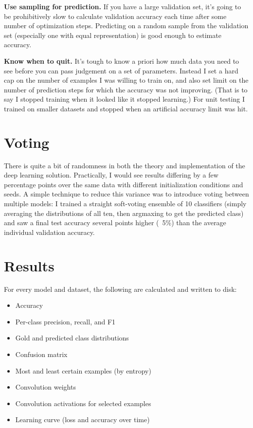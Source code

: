 \documentclass{article}
\begin{document}
\textbf{Use sampling for prediction.} If you have a large validation set, it's going to be prohibitively slow to calculate validation accuracy each time after some number of optimization steps. Predicting on a random sample from the validation set (especially one with equal representation) is good enough to estimate accuracy.

\textbf{Know when to quit.} It's tough to know a priori how much data you need to see before you can pass judgement on a set of parameters. Instead I set a hard cap on the number of examples I was willing to train on, and also set limit on the number of prediction steps for which the accuracy was not improving. (That is to say I stopped training when it looked like it stopped learning.) For unit testing I trained on smaller datasets and stopped when an artificial accuracy limit was hit.

\section{Voting}

There is quite a bit of randomness in both the theory and implementation of the deep learning solution.  Practically, I would see results differing by a few percentage points over the same data with different initialization conditions and seeds. A simple technique to reduce this variance was to introduce voting between multiple models: I trained a straight soft-voting ensemble of 10 classifiers (simply averaging the distributions of all ten, then argmaxing to get the predicted class) and saw a final test accuracy several points higher (~5\%) than the average individual validation accuracy.

\section{Results}

For every model and dataset, the following are calculated and written to disk:

\begin{itemize}
  \item Accuracy
  \item Per-class precision, recall, and F1
  \item Gold and predicted class distributions
  \item Confusion matrix
  \item Most and least certain examples (by entropy)
  \item Convolution weights
  \item Convolution activations for selected examples
  \item Learning curve (loss and accuracy over time)
\end{itemize}
\end{document}
